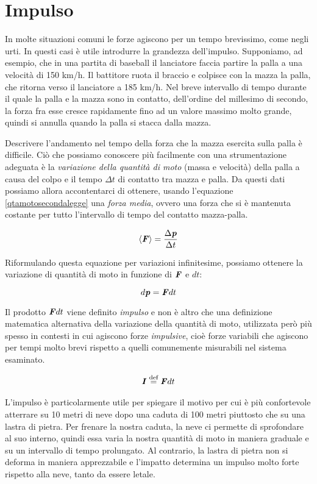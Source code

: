 \section{Impulso}
In molte situazioni comuni le forze agiscono per un tempo brevissimo, come
negli urti. In questi casi è utile introdurre la grandezza dell'impulso.
Supponiamo, ad esempio, che in una partita di baseball il lanciatore faccia
partire la palla a una velocità di 150 km/h. Il battitore ruota il braccio
e colpisce con la mazza la palla, che ritorna verso il lanciatore a 185 km/h.
Nel breve intervallo di tempo durante il quale la palla e la mazza sono in
contatto, dell'ordine del millesimo di secondo, la forza fra esse cresce
rapidamente fino ad un valore massimo molto grande, quindi si annulla quando
la palla si stacca dalla mazza.

Descrivere l'andamento nel tempo della forza che la mazza esercita sulla palla è
difficile. Ciò che possiamo conoscere più facilmente con una strumentazione
adeguata è la \textit{variazione della quantità di moto} (massa e velocità) della
palla a causa del colpo e il tempo $\Delta t$ di contatto tra mazza e palla. Da questi
dati possiamo allora accontentarci di ottenere, usando l'equazione \ref{qtamotosecondalegge} una \textit{forza media}, ovvero
una forza che si è mantenuta costante per tutto l'intervallo di tempo del contatto
mazza-palla.

\[ \left\langle \textbf{\textit{F}}\right\rangle  = \frac{\Delta\textbf{\textit{p}}}{\Delta t} \]

\noindent Riformulando questa equazione per variazioni infinitesime, possiamo
ottenere la variazione di quantità di moto in funzione di $\textbf{\textit{F}}$ e $dt$:

\[ d\textbf{\textit{p}} = \textbf{\textit{F}}dt \]

\noindent Il prodotto $\textbf{\textit{F}}dt$ viene definito \textit{impulso} e non è
altro che una definizione matematica alternativa della variazione della quantità
di moto, utilizzata però più spesso in contesti in cui agiscono forze \textit{impulsive},
cioè forze variabili che agiscono per tempi molto brevi rispetto a quelli
comunemente misurabili nel sistema esaminato.

\begin{align}
    \textbf{\textit{I}} \stackrel{\text{def}}{=} \textbf{\textit{F}}dt\label{impulso}
\end{align}

\noindent L'impulso è particolarmente utile per spiegare il motivo per cui
è più confortevole atterrare su 10 metri di neve dopo una caduta di 100 metri
piuttosto che su una lastra di pietra. Per frenare la nostra caduta, la neve
ci permette di sprofondare al suo interno, quindi essa varia la nostra quantità
di moto in maniera graduale e su un intervallo di tempo prolungato. Al contrario,
la lastra di pietra non si deforma in maniera apprezzabile e l'impatto determina
un impulso molto forte rispetto alla neve, tanto da essere letale.


